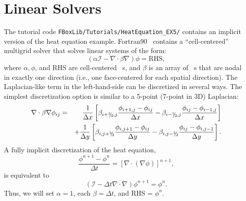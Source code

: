 \section{Linear Solvers}\label{Sec:Linear Solvers}
The tutorial code {\tt FBoxLib/Tutorials/HeatEquation\_EX5/}
contains an implicit version of the heat equation example.  Fortran90
\FBoxLib\ contains a ``cell-centered'' multigrid solver that solves
linear systems of the form:
\begin{equation}
(\alpha\mathcal{I} - \nabla\cdot\beta\nabla)\phi = \text{RHS},
\end{equation}
where $\alpha, \phi$, and RHS are cell-centered \MultiFab~s, and
$\beta$ is an array of \MultiFab~s that are nodal in exactly one
direction (i.e., one face-centered \MultiFab for each spatial
direction).  The Laplacian-like term in the left-hand-side can be
discretized in several ways.  The simplest discretization option is
similar to a 5-point (7-point in 3D) Laplacian:
\begin{eqnarray}
\nabla\cdot\beta\nabla\phi_{ij} &=&
\frac{1}{\Delta x} \left[\beta_{i+\myhalf,j}\frac{\phi_{i+1,j} - \phi_{ij}}{\Delta x} - \beta_{i-\myhalf,j}\frac{\phi_{ij} - \phi_{i-1,j}}{\Delta x}\right]\nonumber\\
&&+ \frac{1}{\Delta y} \left[\beta_{i,j+\myhalf}\frac{\phi_{i,j+1} - \phi_{ij}}{\Delta y} - \beta_{i,j-\myhalf}\frac{\phi_{ij} - \phi_{i,j-1}}{\Delta y}\right].
\end{eqnarray}
A fully implicit discretization of the heat equation,
\begin{equation}
\frac{\phi^{n+1} - \phi^n}{\Delta t} = \left[\nabla\cdot(\nabla\phi)\right]^{n+1},
\end{equation}
is equivalent to
\begin{equation}
(\mathcal{I} - \Delta t\nabla\cdot\nabla)\phi^{n+1} = \phi^n.
\end{equation}
Thus, we will set $\alpha=1$, each $\beta=\Delta t$, and RHS = $\phi^n$.

